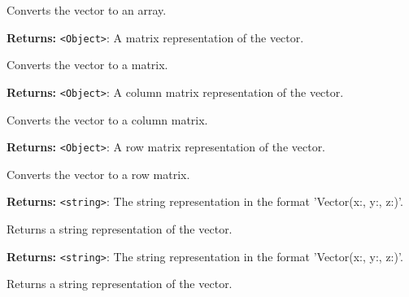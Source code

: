 \documentclass[12pt,a4paper]{article}
\begin{document}
\noindent Converts the vector to an array.

\vspace{5mm}
\noindent {}


\noindent \textbf{Returns:} \texttt{<Object>}: A matrix representation of the vector.

\noindent Converts the vector to a matrix.

\vspace{5mm}
\noindent {}


\noindent \textbf{Returns:} \texttt{<Object>}: A column matrix representation of the vector.

\noindent Converts the vector to a column matrix.

\vspace{5mm}
\noindent {}


\noindent \textbf{Returns:} \texttt{<Object>}: A row matrix representation of the vector.

\noindent Converts the vector to a row matrix.

\vspace{5mm}
\noindent {}


\noindent \textbf{Returns:} \texttt{<string>}: The string representation in the format 'Vector(x:, y:, z:)'.

\noindent Returns a string representation of the vector.

\vspace{5mm}
\noindent {}


\noindent \textbf{Returns:} \texttt{<string>}: The string representation in the format 'Vector(x:, y:, z:)'.

\noindent Returns a string representation of the vector.

\vspace{5mm}
\noindent {}
\end{document}
